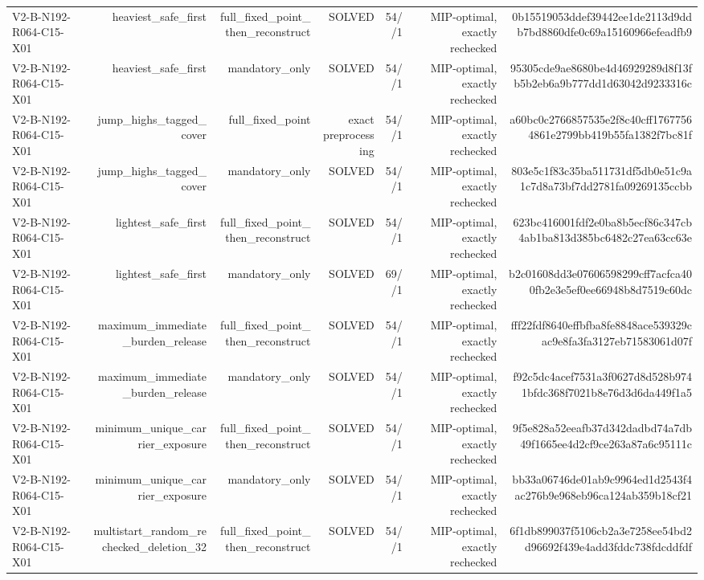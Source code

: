 {\begin{longtable}{lrrrrrr}
V2-B-N192-R064-C15-X01 & heaviest\_safe\_first & full\_fixed\_point\_then\_reconstruct & SOLVED & 54//1 & MIP-optimal, exactly rechecked & 0b15519053ddef39442ee1de2113d9ddb7bd8860dfe0c69a15160966efeadfb9 \\
V2-B-N192-R064-C15-X01 & heaviest\_safe\_first & mandatory\_only & SOLVED & 54//1 & MIP-optimal, exactly rechecked & 95305cde9ae8680be4d46929289d8f13fb5b2eb6a9b777dd1d63042d9233316c \\
V2-B-N192-R064-C15-X01 & jump\_highs\_tagged\_cover & full\_fixed\_point & exact preprocessing & 54//1 & MIP-optimal, exactly rechecked & a60bc0c2766857535e2f8c40cff17677564861e2799bb419b55fa1382f7bc81f \\
V2-B-N192-R064-C15-X01 & jump\_highs\_tagged\_cover & mandatory\_only & SOLVED & 54//1 & MIP-optimal, exactly rechecked & 803e5c1f83c35ba511731df5db0e51c9a1c7d8a73bf7dd2781fa09269135ccbb \\
V2-B-N192-R064-C15-X01 & lightest\_safe\_first & full\_fixed\_point\_then\_reconstruct & SOLVED & 54//1 & MIP-optimal, exactly rechecked & 623bc416001fdf2e0ba8b5ecf86c347cb4ab1ba813d385bc6482c27ea63cc63e \\
V2-B-N192-R064-C15-X01 & lightest\_safe\_first & mandatory\_only & SOLVED & 69//1 & MIP-optimal, exactly rechecked & b2c01608dd3e07606598299cff7acfca400fb2e3e5ef0ee66948b8d7519c60dc \\
V2-B-N192-R064-C15-X01 & maximum\_immediate\_burden\_release & full\_fixed\_point\_then\_reconstruct & SOLVED & 54//1 & MIP-optimal, exactly rechecked & fff22fdf8640effbfba8fe8848ace539329cac9e8fa3fa3127eb71583061d07f \\
V2-B-N192-R064-C15-X01 & maximum\_immediate\_burden\_release & mandatory\_only & SOLVED & 54//1 & MIP-optimal, exactly rechecked & f92c5dc4acef7531a3f0627d8d528b9741bfdc368f7021b8e76d3d6da449f1a5 \\
V2-B-N192-R064-C15-X01 & minimum\_unique\_carrier\_exposure & full\_fixed\_point\_then\_reconstruct & SOLVED & 54//1 & MIP-optimal, exactly rechecked & 9f5e828a52eeafb37d342dadbd74a7db49f1665ee4d2cf9ce263a87a6c95111c \\
V2-B-N192-R064-C15-X01 & minimum\_unique\_carrier\_exposure & mandatory\_only & SOLVED & 54//1 & MIP-optimal, exactly rechecked & bb33a06746de01ab9c9964ed1d2543f4ac276b9e968eb96ca124ab359b18cf21 \\
V2-B-N192-R064-C15-X01 & multistart\_random\_rechecked\_deletion\_32 & full\_fixed\_point\_then\_reconstruct & SOLVED & 54//1 & MIP-optimal, exactly rechecked & 6f1db899037f5106cb2a3e7258ee54bd2d96692f439e4add3fddc738fdcddfdf \\

\end{longtable}}
